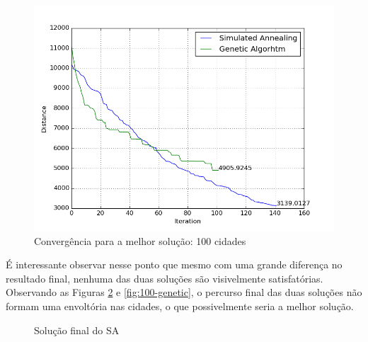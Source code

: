 \documentclass[journal, a4paper]{IEEEtran}
\begin{document}
    \begin{figure}[H]
		\begin{center}
		\includegraphics[width=\columnwidth]{100-comparacao.png}
		\caption{Convergência para a melhor solução: 100 cidades}
		\label{fig:comp-100}
		\end{center}
	\end{figure}

    É interessante observar nesse ponto que mesmo com uma grande diferença no resultado final, nenhuma das duas soluções são visivelmente satisfatórias. Observando as Figuras \ref{fig:100-simulated} e \ref{fig:100-genetic}, o percurso final das duas soluções não formam uma envoltória nas cidades, o que possivelmente seria a melhor solução.

    \begin{figure}[H]
		\begin{center}
		\caption{Solução final do SA}
		\label{fig:100-simulated}
		\end{center}
	\end{figure}
\end{document}
